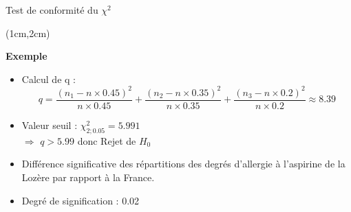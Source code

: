 \documentclass{beamer}
\begin{document}
\begin{frame}{Test de conformité du $\chi^2$}
\begin{textblock*}{\textwidth}(1cm,2cm)

\begin{center}{\bf \Large Exemple} \end{center}

\begin{itemize}
\item Calcul de q : 
$$q = \frac{(n_1 - n\times 0.45)^2}{n\times 0.45} + \frac{(n_2 - n\times 0.35)^2}{n\times 0.35}
+ \frac{(n_3 - n\times 0.2)^2}{n\times 0.2} \approx 8.39$$

\item Valeur seuil : $\chi^2_{2 ; 0.05} = 5.991$ \\
$\Rightarrow$ $q>5.99$ donc Rejet de $H_0$ \\

\item Différence significative des répartitions des degrés d'allergie à
l'aspirine de la Lozère par rapport à la France. 

\item Degré de signification : 0.02\\
\end{itemize}


\end{textblock*}

\end{frame}

\end{document}
